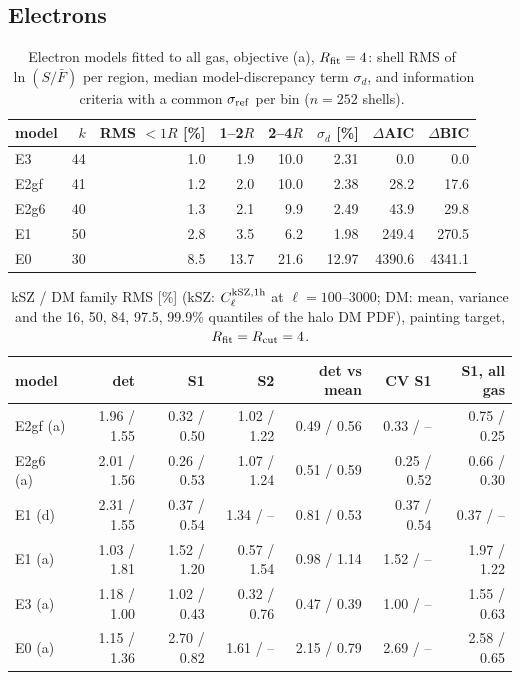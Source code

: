 \documentclass[10pt,a4paper]{article}
\begin{document}
\subsection{Electrons}
\begin{table}[H]
\centering
\footnotesize
\caption{Electron models fitted to all gas, objective (a), $R_{\rm fit}=4$: shell RMS of $\ln(S/\bar F)$ per region, median model-discrepancy term $\sigma_d$, and information criteria with a common $\sigma_{\rm ref}$ per bin ($n=252$ shells).}
\label{tab:icE}
\begin{tabular}{lrrrrrrr}
\toprule
model & $k$ & RMS $<1R$ [\%] & 1--2$R$ & 2--4$R$ & $\sigma_d$ [\%] & $\Delta$AIC & $\Delta$BIC \\
\midrule
E3 & 44 & 1.0 & 1.9 & 10.0 & 2.31 & 0.0 & 0.0 \\
E2gf & 41 & 1.2 & 2.0 & 10.0 & 2.38 & 28.2 & 17.6 \\
E2g6 & 40 & 1.3 & 2.1 & 9.9 & 2.49 & 43.9 & 29.8 \\
E1 & 50 & 2.8 & 3.5 & 6.2 & 1.98 & 249.4 & 270.5 \\
E0 & 30 & 8.5 & 13.7 & 21.6 & 12.97 & 4390.6 & 4341.1 \\
\bottomrule
\end{tabular}
\end{table}
\begin{table}[H]
\centering
\footnotesize
\caption{kSZ / DM family RMS [\%] (kSZ: $C_\ell^{\rm kSZ,1h}$ at $\ell=100$--$3000$; DM: mean, variance and the 16, 50, 84, 97.5, 99.9\% quantiles of the halo DM PDF), painting target, $R_{\rm fit}=R_{\rm cut}=4$.}
\label{tab:obsE}
\begin{tabular}{lrrrrrr}
\toprule
model & det & S1 & S2 & det vs mean & CV S1 & S1, all gas \\
\midrule
E2gf (a) & 1.96 / 1.55 & 0.32 / 0.50 & 1.02 / 1.22 & 0.49 / 0.56 & 0.33 / -- & 0.75 / 0.25 \\
E2g6 (a) & 2.01 / 1.56 & 0.26 / 0.53 & 1.07 / 1.24 & 0.51 / 0.59 & 0.25 / 0.52 & 0.66 / 0.30 \\
E1 (d) & 2.31 / 1.55 & 0.37 / 0.54 & 1.34 / -- & 0.81 / 0.53 & 0.37 / 0.54 & 0.37 / -- \\
E1 (a) & 1.03 / 1.81 & 1.52 / 1.20 & 0.57 / 1.54 & 0.98 / 1.14 & 1.52 / -- & 1.97 / 1.22 \\
E3 (a) & 1.18 / 1.00 & 1.02 / 0.43 & 0.32 / 0.76 & 0.47 / 0.39 & 1.00 / -- & 1.55 / 0.63 \\
E0 (a) & 1.15 / 1.36 & 2.70 / 0.82 & 1.61 / -- & 2.15 / 0.79 & 2.69 / -- & 2.58 / 0.65 \\
\bottomrule
\end{tabular}
\end{table}
\end{document}
